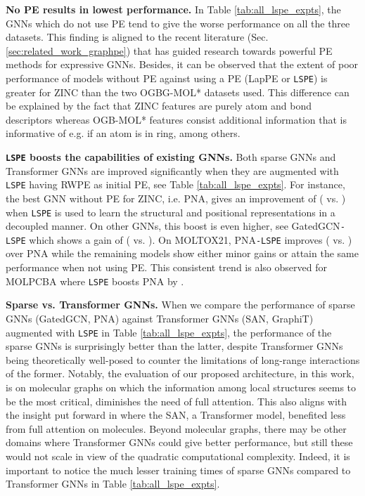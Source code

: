 \documentclass{article} \usepackage{iclr2021_conference,times}
\begin{document}
{\bf No PE results in lowest performance.} In Table \ref{tab:all_lspe_expts}, the GNNs which do not use PE tend to give the worse performance on all the three datasets. This finding is aligned to the recent literature (Sec. \ref{sec:related_work_graphpe}) that has guided research towards powerful PE methods for expressive GNNs. Besides, it can be observed that the extent of poor performance of models without PE against using a PE (LapPE or \texttt{LSPE}) is greater for ZINC than the two OGBG-MOL* datasets used. This difference can be explained by the fact that ZINC
features are purely atom and bond descriptors whereas OGB-MOL* features consist additional information that is informative of e.g. 
if an atom is in ring, among others.


{\bf \texttt{LSPE} boosts the capabilities of existing GNNs.}
Both sparse GNNs and Transformer GNNs are improved significantly when they are augmented with \texttt{LSPE} having RWPE as initial PE, see Table \ref{tab:all_lspe_expts}. For instance, the best GNN without PE for ZINC, i.e. PNA, gives an improvement of  ( vs. ) when \texttt{LSPE} is used to learn the structural and positional representations in a decoupled manner. On other GNNs, this boost is even higher, see GatedGCN\texttt{-LSPE} which shows a gain of
 ( vs. ).
On MOLTOX21, PNA\texttt{-LSPE} improves  ( vs. ) over PNA while the remaining models show either minor gains or attain the same performance when not using PE. This consistent trend is also observed for MOLPCBA where \texttt{LSPE} boosts PNA by .

{\bf Sparse vs. Transformer GNNs.} When we compare the performance of sparse GNNs (GatedGCN, PNA) against Transformer GNNs (SAN, GraphiT) augmented with \texttt{LSPE} in Table \ref{tab:all_lspe_expts}, the performance of the sparse GNNs is surprisingly better than the latter, despite Transformer GNNs being theoretically well-posed to counter the limitations of long-range interactions of the former. Notably, the evaluation of our proposed architecture, in this work, is on molecular graphs on which the information among local structures seems to be the most critical, diminishes the need of full attention. This also aligns with the insight put forward in \cite{kreuzer2021rethinking} where the SAN, a Transformer model, benefited less from full attention on molecules. Beyond molecular graphs, there may be other domains where Transformer GNNs could give better performance, but still these would not scale in view of the quadratic computational complexity. Indeed, it is important to notice the much lesser training times of sparse GNNs compared to Transformer GNNs in Table \ref{tab:all_lspe_expts}.
\end{document}
